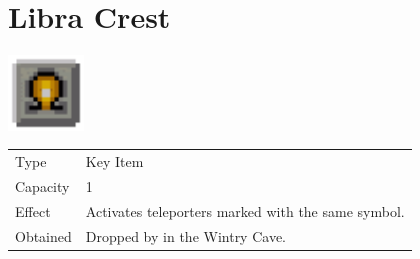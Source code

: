 \section{Libra Crest}
\label{item:libra_crest}

\includegraphics[height=2cm,keepaspectratio]{./resources/items/libracrest}

\begin{longtable}{ l p{9cm} }
	Type
	& Key Item
\\ %
	Capacity
	& 1
\\ %
	Effect
	& Activates teleporters marked with the same symbol.
\\ %
	Obtained
	& Dropped by \nameref{monster:squidite} in the Wintry Cave.
\end{longtable}
